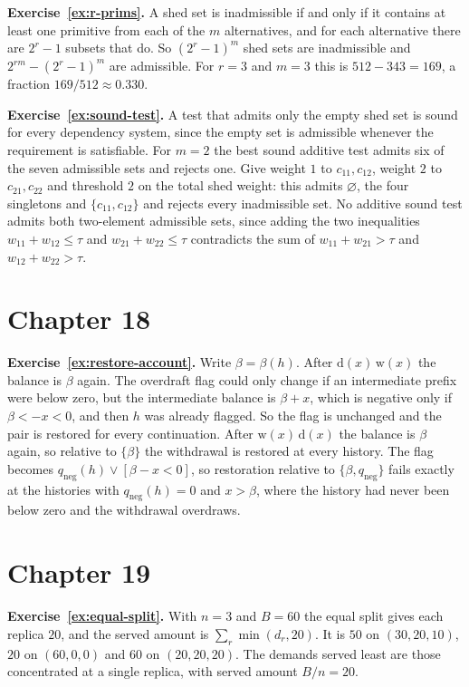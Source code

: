 \textbf{Exercise~\ref{ex:r-prims}.} A shed set is inadmissible if and only if it contains at least one primitive from each of the $m$ alternatives, and for each alternative there are $2^{r}-1$ subsets that do. So $(2^{r}-1)^{m}$ shed sets are inadmissible and $2^{rm}-(2^{r}-1)^{m}$ are admissible. For $r=3$ and $m=3$ this is $512-343=169$, a fraction $169/512\approx0.330$.

\textbf{Exercise~\ref{ex:sound-test}.} A test that admits only the empty shed set is sound for every dependency system, since the empty set is admissible whenever the requirement is satisfiable. For $m=2$ the best sound additive test admits six of the seven admissible sets and rejects one. Give weight $1$ to $c_{11},c_{12}$, weight $2$ to $c_{21},c_{22}$ and threshold $2$ on the total shed weight: this admits $\varnothing$, the four singletons and $\{c_{11},c_{12}\}$ and rejects every inadmissible set. No additive sound test admits both two-element admissible sets, since adding the two inequalities $w_{11}+w_{12}\le\tau$ and $w_{21}+w_{22}\le\tau$ contradicts the sum of $w_{11}+w_{21}>\tau$ and $w_{12}+w_{22}>\tau$.

\section*{Chapter 18}

\textbf{Exercise~\ref{ex:restore-account}.} Write $\beta=\beta(h)$. After $\mathrm{d}(x)\,\mathrm{w}(x)$ the balance is $\beta$ again. The overdraft flag could only change if an intermediate prefix were below zero, but the intermediate balance is $\beta+x$, which is negative only if $\beta<-x<0$, and then $h$ was already flagged. So the flag is unchanged and the pair is restored for every continuation. After $\mathrm{w}(x)\,\mathrm{d}(x)$ the balance is $\beta$ again, so relative to $\{\beta\}$ the withdrawal is restored at every history. The flag becomes $q_{\mathrm{neg}}(h)\vee[\beta-x<0]$, so restoration relative to $\{\beta,q_{\mathrm{neg}}\}$ fails exactly at the histories with $q_{\mathrm{neg}}(h)=0$ and $x>\beta$, where the history had never been below zero and the withdrawal overdraws.

\section*{Chapter 19}

\textbf{Exercise~\ref{ex:equal-split}.} With $n=3$ and $B=60$ the equal split gives each replica $20$, and the served amount is $\sum_r\min(d_r,20)$. It is $50$ on $(30,20,10)$, $20$ on $(60,0,0)$ and $60$ on $(20,20,20)$. The demands served least are those concentrated at a single replica, with served amount $B/n=20$.

